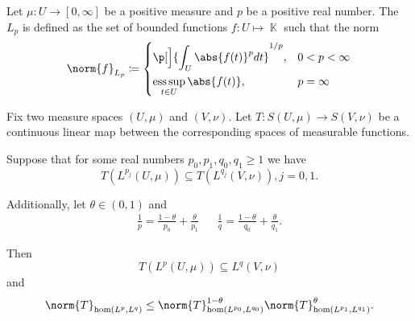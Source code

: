 \begin{definition}\label{def:lebesgue_space}\cite[6]{Bergh1976}
  Let \( \mu: U \to [0, \infty] \) be a positive measure and \( p \) be a positive real number. The  \( L_p \) is defined as the set of bounded functions \( f: U \mapsto \BbbK \) such that the norm
  \begin{equation*}
    \norm{f}_{L_p} \coloneqq \begin{dcases}
      \p[\Big]{\int_U \abs{f(t)}^p dt}^{1/p}, &0 < p < \infty \\
      \ess\sup_{t \in U} \abs{f(t)} , &p = \infty
    \end{dcases}
  \end{equation*}
\end{definition}

\begin{theorem}\label{thm:riesz_thorin}\mcite\cite[24]{Bergh1976}
  Fix two measure spaces \( (U, \mu) \) and \( (V, \nu) \). Let \( T: S(U, \mu) \to S(V, \nu) \) be a continuous linear map between the corresponding spaces of measurable functions.

  Suppose that for some real numbers \( p_0, p_1, q_0, q_1 \geq 1 \) we have
  \begin{equation*}
    T(L^{p_j}(U, \mu)) \subseteq T(L^{q_j}(V, \nu)), j = 0, 1.
  \end{equation*}

  Additionally, let \( \theta \in (0, 1) \) and
  \begin{align*}
    \frac 1 p = \frac {1 - \theta} {p_0} + \frac {\theta} {p_1}
    &&
    \frac 1 q = \frac {1 - \theta} {q_0} + \frac {\theta} {q_1}.
  \end{align*}

  Then
  \begin{equation*}
    T(L^p(U, \mu)) \subseteq L^q(V, \nu)
  \end{equation*}
  and
  \begin{equation*}
    \norm{T}_{\hom(L^p, L^q)} \leq \norm{T}_{\hom(L^{p_0}, L^{q_0})}^{1 - \theta} \norm{T}_{\hom(L^{p_1}, L^{q_1})}^\theta.
  \end{equation*}
\end{theorem}

